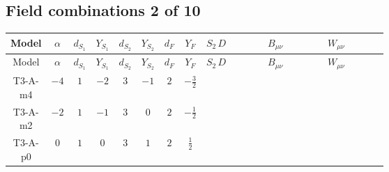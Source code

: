 \documentclass[8pt]{article}
\begin{document}
\begin{landscape}
\subsection*{Field combinations 2 of 10}
\begin{longtable}{@{}cccccccc >{\raggedright\arraybackslash}p{0.21\linewidth} >{\raggedright\arraybackslash}p{0.21\linewidth} >{\raggedright\arraybackslash}p{0.21\linewidth}@{}}
\toprule
Model & $\alpha$ & $d_{S_1}$ & $Y_{S_1}$ & $d_{S_2}$ & $Y_{S_2}$ & $d_F$ & $Y_F$ & $S_2\,D$ & $B_{\mu\nu}$ & $W_{\mu\nu}$ \\
\midrule
\endfirsthead
\toprule
Model & $\alpha$ & $d_{S_1}$ & $Y_{S_1}$ & $d_{S_2}$ & $Y_{S_2}$ & $d_F$ & $Y_F$ & $S_2\,D$ & $B_{\mu\nu}$ & $W_{\mu\nu}$ \\
\midrule
\endhead
T3-A-m4 & $-4$ & $1$ & $-2$ & $3$ & $-1$ & $2$ & $-\frac{3}{2}$ & \scriptsize\adjustbox{max width=\linewidth}{$\begin{gathered} +D_{\mu _1}\left(S_{2,j_1}\right){}^{\dagger } D_{\mu _1}\left(S_{2,j_1}\right)\end{gathered}$} & \scriptsize\adjustbox{max width=\linewidth}{$\begin{gathered} -\frac{9 \hbar  B_{\mu _1\mu _2}^2}{2 \epsilon }\end{gathered}$} & \scriptsize\adjustbox{max width=\linewidth}{$\begin{gathered} -\frac{\hbar  \left(W_{\mu _1\mu _2}^{A_1}\right){}^2}{2 \epsilon }\end{gathered}$} \\
\midrule
T3-A-m2 & $-2$ & $1$ & $-1$ & $3$ & $0$ & $2$ & $-\frac{1}{2}$ & \scriptsize\adjustbox{max width=\linewidth}{$\begin{gathered} +D_{\mu _1}\left(S_{2,j_1}\right){}^{\dagger } D_{\mu _1}\left(S_{2,j_1}\right)\end{gathered}$} & \scriptsize\adjustbox{max width=\linewidth}{$\begin{gathered} -\frac{\hbar  B_{\mu _1\mu _2}^2}{2 \epsilon }\end{gathered}$} & \scriptsize\adjustbox{max width=\linewidth}{$\begin{gathered} -\frac{\hbar  \left(W_{\mu _1\mu _2}^{A_1}\right){}^2}{2 \epsilon }\end{gathered}$} \\
\midrule
T3-A-p0 & $0$ & $1$ & $0$ & $3$ & $1$ & $2$ & $\frac{1}{2}$ & \scriptsize\adjustbox{max width=\linewidth}{$\begin{gathered} +D_{\mu _1}\left(S_{2,j_1}\right){}^{\dagger } D_{\mu _1}\left(S_{2,j_1}\right)\end{gathered}$} & \scriptsize\adjustbox{max width=\linewidth}{$\begin{gathered} -\frac{\hbar  B_{\mu _1\mu _2}^2}{2 \epsilon }\end{gathered}$} & \scriptsize\adjustbox{max width=\linewidth}{$\begin{gathered} -\frac{\hbar  \left(W_{\mu _1\mu _2}^{A_1}\right){}^2}{2 \epsilon }\end{gathered}$} \\

\end{longtable}
\end{landscape}
\end{document}
